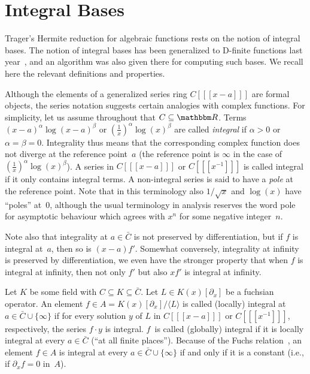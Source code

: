 \documentclass{sig-alternate}
\def\<#1>{\langle#1\rangle}
\let\set\mathbbm
\begin{document}
\section{Integral Bases}

Trager's Hermite reduction for algebraic functions rests on the notion of
integral bases. The notion of integral bases has been generalized to D-finite
functions last year~\cite{kauers15b}, and an algorithm was also given there for
computing such bases. We recall here the relevant definitions and properties.

Although the elements of a generalized series ring $C[[[x-a]]]$ are formal
objects, the series notation suggests certain analogies with complex
functions.  For simplicity, let us assume throughout that $C\subseteq\set
R$. Terms $(x-a)^\alpha\log(x-a)^\beta$ or $(\tfrac1x)^\alpha\log(x)^\beta$ are
called \emph{integral} if $\alpha>0$ or $\alpha=\beta=0$.
Integrality thus means that the corresponding complex
function does not diverge at the reference point~$a$ (the reference point is
$\infty$ in the case of $(\tfrac1x)^\alpha\log(x)^\beta$). A series in
$C[[[x-a]]]$ or $C[[[x^{-1}]]]$ is called integral if it only contains integral
terms. A non-integral series is said to have a \emph{pole} at the reference
point.  Note that in this terminology also $1/\sqrt{x}$ and $\log(x)$ have
``poles'' at~$0$, although the usual terminology in analysis reserves the word pole for
asymptotic behaviour which agrees with $x^n$ for some negative integer~$n$.

Note also that integrality at $a\in\bar C$ is not preserved by differentiation,
but if $f$ is integral at~$a$, then so is $(x-a)f'$. Somewhat conversely,
integrality at infinity is preserved by differentiation, we even have the
stronger property that when $f$ is integral at infinity, then not only $f'$ but also $xf'$ is
integral at infinity.

Let $K$ be some field with $C\subseteq K\subseteq\bar C$.
Let $L\in K(x)[\partial_x]$ be a fuchsian operator. An element $f\in A=K(x)[\partial_x]/\<L>$
is called (locally) integral at $a\in\bar C\cup\{\infty\}$ if for every solution $y$
of $L$ in $C[[[x-a]]]$ or $C[[[x^{-1}]]]$, respectively, the series $f\cdot y$ is
integral. $f$~is called (globally) integral if it is locally integral at every
$a\in\bar C$ (``at all finite places''). Because of the Fuchs relation~\cite{ince26}, an
element $f\in A$ is integral at every $a\in\bar C\cup\{\infty\}$ if and only if it
is a constant (i.e., if $\partial_xf=0$ in~$A$).
\end{document}
